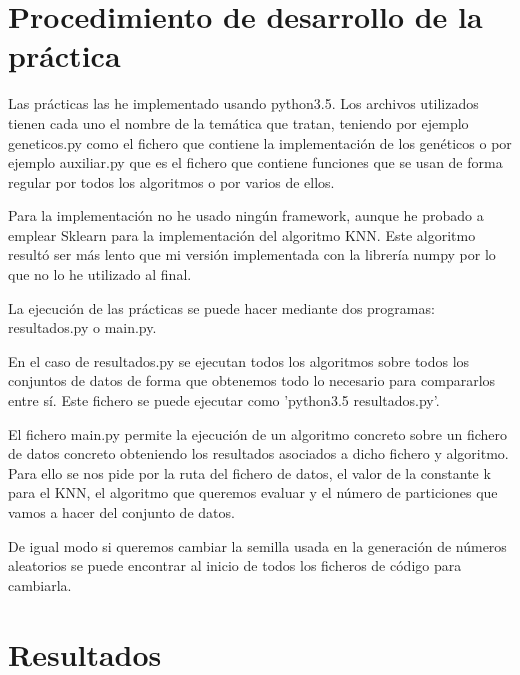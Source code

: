 \documentclass[12pt,a4paper]{article}
\begin{document}
	\newpage

	\section{Procedimiento de desarrollo de la práctica}
	\label{sec:procedimiento}

	Las prácticas las he implementado usando python3.5. Los archivos utilizados tienen cada uno el nombre de la temática que tratan, teniendo por ejemplo geneticos.py como el fichero que contiene la implementación de los genéticos o por ejemplo auxiliar.py que es el fichero que contiene funciones que se usan de forma regular por todos los algoritmos o por varios de ellos.

	Para la implementación no he usado ningún framework, aunque he probado a emplear Sklearn para la implementación del algoritmo KNN. Este algoritmo resultó ser más lento que mi versión implementada con la librería numpy por lo que no lo he utilizado al final.

	La ejecución de las prácticas se puede hacer mediante dos programas: resultados.py o main.py.

	En el caso de resultados.py se ejecutan todos los algoritmos sobre todos los conjuntos de datos de forma que obtenemos todo lo necesario para compararlos entre sí. Este fichero se puede ejecutar como 'python3.5 resultados.py'.

	El fichero main.py permite la ejecución de un algoritmo concreto sobre un fichero de datos concreto obteniendo los resultados asociados a dicho fichero y algoritmo. Para ello se nos pide por la ruta del fichero de datos, el valor de la constante k para el KNN, el algoritmo que queremos evaluar y el número de particiones que vamos a hacer del conjunto de datos.

	De igual modo si queremos cambiar la semilla usada en la generación de números aleatorios se puede encontrar al inicio de todos los ficheros de código para cambiarla.

	\newpage

	\section{Resultados}
	\label{sec:resultados}
\end{document}
